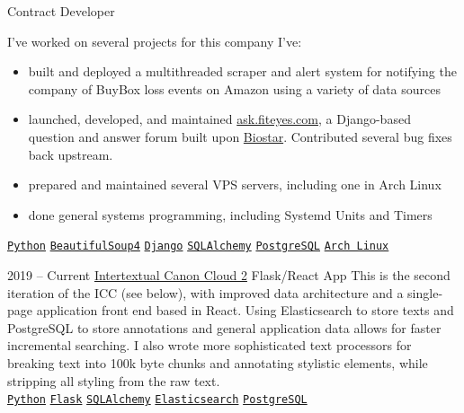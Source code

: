 \documentclass[9pt]{developercv} %
\begin{document}
\begin{entrylist}
        {Contract Developer}
        {
            I've worked on several projects for this company I've:
            \begin{itemize}[leftmargin=*, noitemsep]
                \item built and deployed a multithreaded scraper and alert system for notifying the company of BuyBox loss events on Amazon using a variety of data sources
                \item launched, developed, and maintained {\href{https://ask.fiteyes.com}{ask.fiteyes.com}}, a Django-based question and answer forum built upon {\href{https://github.com/ialbert/biostar-central}{Biostar}}.  Contributed several bug fixes back upstream.
                \item prepared and maintained several VPS servers, including one in Arch Linux
                \item done general systems programming, including Systemd Units and Timers
            \end{itemize}
        \texttt{{\href{https://www.python.org/}{Python}}}\slashsep
        \texttt{{\href{https://www.crummy.com/software/BeautifulSoup/bs4/doc/}{BeautifulSoup4}}}\slashsep
        \texttt{{\href{https://www.djangoproject.com/}{Django}}}\slashsep
        \texttt{{\href{https://www.sqlalchemy.org/}{SQLAlchemy}}}\slashsep
        \texttt{{\href{https://www.postgresql.org/}{PostgreSQL}}}\slashsep
        \texttt{{\href{https://archlinux.org/}{Arch Linux}}}
        }
    \entry
        {2019 -- Current}
        {{\href{https://github.com/Anno-Wiki}{Intertextual Canon Cloud 2}}}
        {Flask/React App}
        {
            This is the second iteration of the ICC (see below), with improved
            data architecture and a single-page application front end based in
            React.  Using Elasticsearch to store texts and PostgreSQL to store
            annotations and general application data allows for faster
            incremental searching. I also wrote more sophisticated text
            processors for breaking text into 100k byte chunks and annotating
            stylistic elements, while stripping all styling from the raw text.
        \\
        \texttt{{\href{https://www.python.org/}{Python}}}\slashsep
        \texttt{{\href{https://flask.palletsprojects.com/en/1.1.x/}{Flask}}}\slashsep
        \texttt{{\href{https://www.sqlalchemy.org/}{SQLAlchemy}}}\slashsep
        \texttt{{\href{https://www.elastic.co/}{Elasticsearch}}}\slashsep
        \texttt{{\href{https://www.postgresql.org/}{PostgreSQL}}}\slashsep
}
\end{entrylist}
\end{document}

